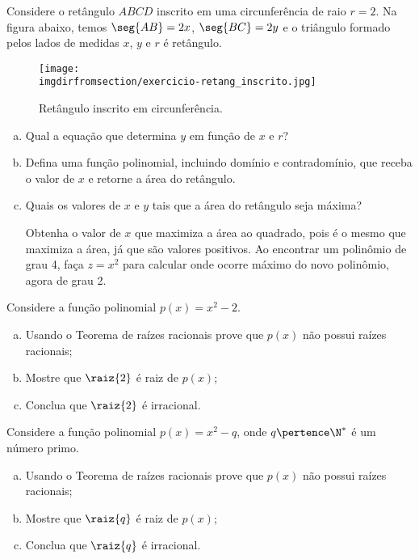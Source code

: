 \begin{exercise}
  Considere o retângulo $ABCD$ inscrito em uma circunferência de raio $r = 2$. Na figura abaixo, temos $\seg{AB}=2x$, $\seg{BC} = 2y$ e o triângulo formado pelos lados de medidas $x$, $y$ e $r$ é retângulo.
  \begin{figure}[H]
    \centering
    \label{fig:exercicio-retang_inscrito}
    \texttt{[image: \\imgdirfromsection/exercicio-retang\_inscrito.jpg]}
    \caption{Retângulo inscrito em circunferência.}
  \end{figure}
  \begin{enumerate}[a)]
      \item Qual a equação que determina $y$ em função de $x$ e $r$?
      \item Defina uma função polinomial, incluindo domínio e contradomínio, que receba o valor de $x$ e retorne a área do retângulo.
      \item Quais os valores de $x$ e $y$ tais que a área do retângulo seja máxima? 
      \begin{hint}
        Obtenha o valor de $x$ que maximiza a área ao quadrado, pois é o mesmo que maximiza a área, já que são valores positivos. Ao encontrar um polinômio de grau 4, faça $z=x^2$ para calcular onde ocorre máximo do novo polinômio, agora de grau 2.
      \end{hint} 
  \end{enumerate}
\end{exercise}

\begin{exercise}
  Considere a função polinomial $p(x)=x^2-2$.
  \begin{enumerate}[a)]
    \item Usando o Teorema de raízes racionais prove que $p(x)$ não possui raízes racionais;
    \item Mostre que $\raiz{2}$ é raiz de $p(x)$;
    \item Conclua que $\raiz{2}$ é irracional.
  \end{enumerate}
\end{exercise}

\begin{exercise}
  Considere a função polinomial $p(x)=x^2-q$, onde $q \pertence \N^\ast$ é um número primo.
  \begin{enumerate}[a)]
    \item Usando o Teorema de raízes racionais prove que $p(x)$ não possui raízes racionais;
    \item Mostre que $\raiz{q}$ é raiz de $p(x)$;
    \item Conclua que $\raiz{q}$ é irracional.
\end{enumerate}
\end{exercise}

